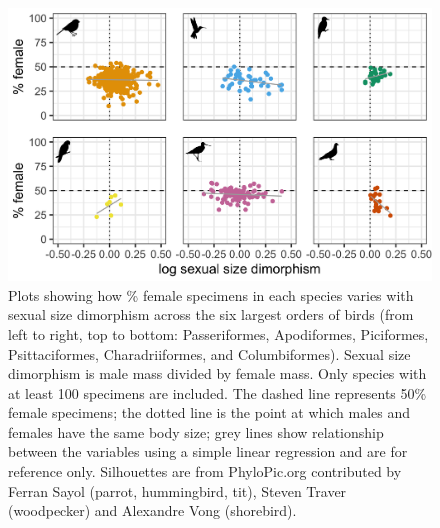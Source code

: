 \documentclass[a4paper, 12pt]{article}
\begin{document}
\begin{figure}[H]
 \centering
  \includegraphics[width = \linewidth]{figures/ssd-orders-birds.png}
  \caption{Plots showing how \% female specimens in each species varies with sexual size dimorphism across the six largest orders of birds (from left to right, top to bottom: Passeriformes, Apodiformes, Piciformes, Psittaciformes, Charadriiformes, and Columbiformes).
  Sexual size dimorphism is male mass divided by female mass. 
  Only species with at least 100 specimens are included. 
  The dashed line represents 50\% female specimens; the dotted line is the point at which males and females have the same body size; grey lines show relationship between the variables using a simple linear regression and are for reference only. 
  Silhouettes are from PhyloPic.org contributed by Ferran Sayol (parrot, hummingbird, tit), Steven Traver (woodpecker) and Alexandre Vong (shorebird).}
  \label{fig-bird-ssd}
\end{figure}
\end{document}
